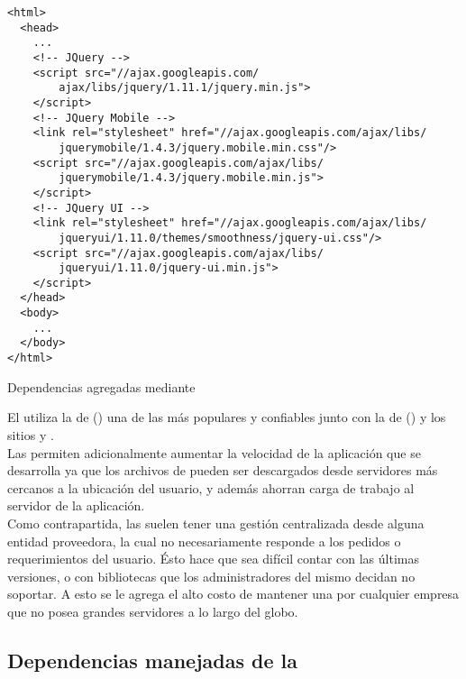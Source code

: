 \begin{listing}[ht]
\begin{verbatim}
<html>
  <head>
    ...
    <!-- JQuery -->
    <script src="//ajax.googleapis.com/
        ajax/libs/jquery/1.11.1/jquery.min.js">
    </script>
    <!-- JQuery Mobile -->
    <link rel="stylesheet" href="//ajax.googleapis.com/ajax/libs/
        jquerymobile/1.4.3/jquery.mobile.min.css"/>
    <script src="//ajax.googleapis.com/ajax/libs/
        jquerymobile/1.4.3/jquery.mobile.min.js">
    </script>
    <!-- JQuery UI -->
    <link rel="stylesheet" href="//ajax.googleapis.com/ajax/libs/
        jqueryui/1.11.0/themes/smoothness/jquery-ui.css"/>
    <script src="//ajax.googleapis.com/ajax/libs/
        jqueryui/1.11.0/jquery-ui.min.js">
    </script>
  </head>
  <body>
    ...
  </body>
</html>
\end{verbatim}
\caption{Dependencias agregadas mediante \cdn}
\label{code:depmgmnt:cdn:cdn_deps}
\end{listing}

El  utiliza la \cdn de 
\citeauthor{GoogleCDN:ONLINE} () una de las más 
populares y confiables junto con la de \citeauthor{MicrosoftCDN:ONLINE} 
() y los sitios  y 
.\\
Las \cdns permiten adicionalmente aumentar la velocidad de la aplicación que se 
desarrolla ya que los archivos de \dependency pueden ser descargados desde 
servidores más cercanos a la ubicación del usuario, y además ahorran carga de 
trabajo al servidor de la aplicación.\\
Como contrapartida, las \cdns suelen tener una gestión centralizada desde 
alguna entidad proveedora, la cual no necesariamente responde a los pedidos o requerimientos del usuario. Ésto hace que sea difícil contar con las últimas 
versiones, o con bibliotecas que los administradores del mismo decidan no 
soportar. A esto se le agrega el alto costo de mantener una \cdn por cualquier 
empresa que no posea grandes servidores a lo largo del globo.

\subsection{Dependencias manejadas de la \viewtier}
\label{subsec:depmgmnt:jvm_dev:view_managed}

